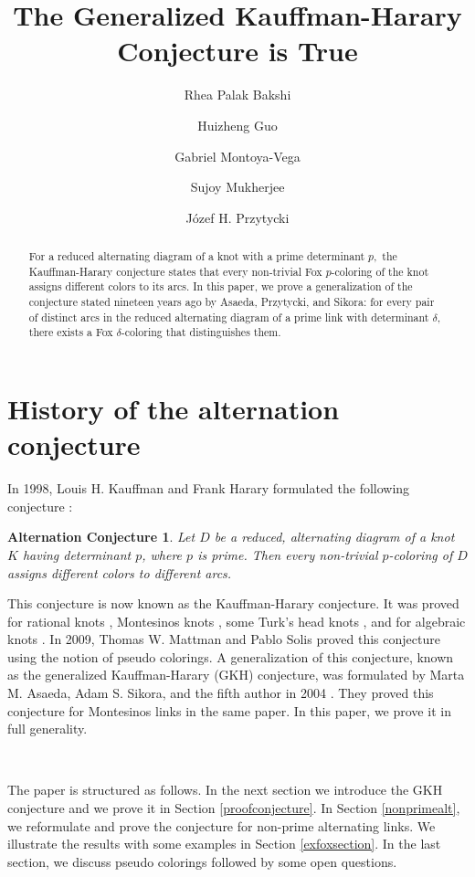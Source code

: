 \documentclass[11pt]{amsart}
\title{The Generalized Kauffman-Harary Conjecture is True}
\author{Rhea Palak Bakshi}
\author{Huizheng Guo}
\author{Gabriel Montoya-Vega}
\author{Sujoy Mukherjee}
\author{J\'{o}zef H. Przytycki}
\newtheorem*{conjecture*}{Alternation Conjecture}
\begin{document}
\begin{abstract}

For a reduced alternating diagram of a knot with a prime determinant $p,$ the Kauffman-Harary conjecture states that every non-trivial Fox $p$-coloring of the knot assigns different colors to its arcs. In this paper, we prove a generalization of the conjecture stated nineteen years ago by Asaeda, Przytycki, and Sikora: for every pair of distinct arcs in the reduced alternating diagram of a prime link with determinant $\delta,$ there exists a Fox $\delta$-coloring that distinguishes them.

\end{abstract}
\maketitle

\tableofcontents

\section{History of the alternation conjecture}

In 1998, Louis H. Kauffman and Frank Harary formulated the following conjecture \cite{HK}:

\begin{conjecture*}

    Let $D$ be a reduced, alternating diagram of a knot $K$ having determinant $p$, where $p$ is prime. Then every non-trivial $p$-coloring of $D$ assigns different colors to different arcs.
    
\end{conjecture*}

This conjecture is now known as the Kauffman-Harary conjecture. It was proved for rational knots \cite{KLa, PDDGS}, Montesinos knots \cite{APS}, some Turk's head knots \cite{DMMS}, and for algebraic knots \cite{DS}. In 2009, Thomas W. Mattman and Pablo Solis proved this conjecture using the notion of pseudo colorings. A generalization of this conjecture, known as the generalized Kauffman-Harary (GKH) conjecture, was formulated by Marta M. Asaeda, Adam S. Sikora, and the fifth author in 2004 \cite{APS}. They proved this conjecture for Montesinos links in the same paper. In this paper, we prove it in full generality.

\

The paper is structured as follows. In the next section we introduce the GKH conjecture and we prove it in Section \ref{proofconjecture}. In Section \ref{nonprimealt}, we reformulate and prove the conjecture for non-prime alternating links.  We illustrate the results with some examples in Section \ref{exfoxsection}. In the last  section, we discuss pseudo colorings followed by some open questions.
\end{document}
